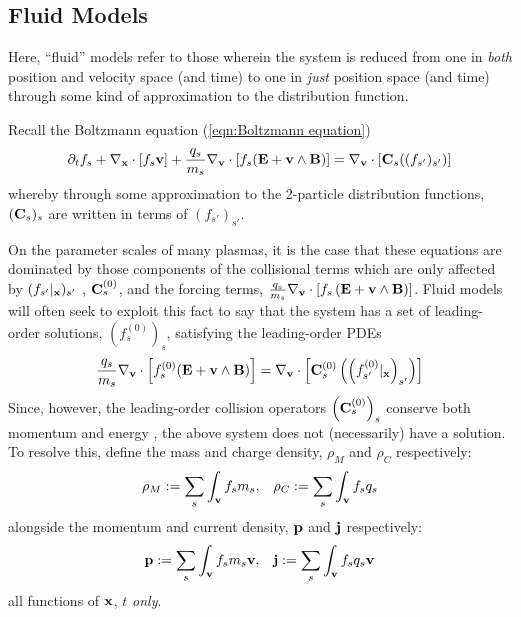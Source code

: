 \subsection*{Fluid Models}
    \noindent\makebox[\linewidth]{\rule{\textwidth}{0.4pt}}
    \begin{definition}
        Here, ``fluid'' models refer to those wherein the system is reduced from one in \emph{both} position and velocity space (and time) to one in \emph{just} position space (and time) through some kind of approximation to the distribution function.
    \end{definition}
    \noindent\makebox[\linewidth]{\rule{\textwidth}{0.4pt}}
    Recall the Boltzmann equation (\ref{eqn:Boltzmann equation})
    \begin{equation*}
        \partial_{t}f_{s} + \nabla_{\mathbf{x}}\cdot[f_{s}\mathbf{v}] + \frac{q_{s}}{m_{s}}\nabla_{\mathbf{v}}\cdot[f_{s}(\mathbf{E} + \mathbf{v}\wedge\mathbf{B})]  =  \nabla_{\mathbf{v}}\cdot[\mathbf{C}_{s}((f_{s'})_{s'})]
    \end{equation*}
    whereby through some approximation to the 2-particle distribution functions, $(\mathbf{C}_{s})_{s}$ are written in terms of $(f_{s'})_{s'}$.
    
    On the parameter scales of many plasmas, it is the case that these equations are dominated by those components of the collisional terms which are only affected by $(f_{s'}|_{\mathbf{x}})_{s'}$ , $\mathbf{C}_{s}^{(0)}$, and the forcing terms, $\frac{q_{s}}{m_{s}}\nabla_{\mathbf{v}}\cdot[f_{s}\left(\mathbf{E} + \mathbf{v}\wedge\mathbf{B}\right)]$. Fluid models will often seek to exploit this fact to say that the system has a set of leading-order solutions, $\left(f_{s}^{(0)}\right)_{s}$, satisfying the leading-order PDEs
    \begin{equation}
        \frac{q_{s}}{m_{s}}\nabla_{\mathbf{v}}\cdot\left[f_{s}^{(0)}(\mathbf{E} + \mathbf{v}\wedge\mathbf{B})\right]  =  \nabla_{\mathbf{v}}\cdot\left[\mathbf{C}_{s}^{(0)}\left(\left(f_{s'}^{(0)}|_{\mathbf{x}}\right)_{s'}\right)\right]
    \end{equation}
    Since, however, the leading-order collision operators $\left(\mathbf{C}_{s}^{(0)}\right)_{s}$ conserve both momentum and energy , the above system does not (necessarily) have a solution. To resolve this, define the mass and charge density, $\rho_{M}$ and $\rho_{C}$ respectively:
    \begin{align}
        \rho_{M}  :=  \sum_{s}\int_{\mathbf{v}}f_{s}m_{s},  &&
        \rho_{C}  :=  \sum_{s}\int_{\mathbf{v}}f_{s}q_{s}
    \end{align}
    alongside the momentum and current density, $\mathbf{p}$ and $\mathbf{j}$ respectively:
    \begin{align}
        \mathbf{p}  :=  \sum_{s}\int_{\mathbf{v}}f_{s}m_{s}\mathbf{v},  &&
        \mathbf{j}  :=  \sum_{s}\int_{\mathbf{v}}f_{s}q_{s}\mathbf{v}
    \end{align}
    all functions of $\mathbf{x}$, $t$ \emph{only}.
    
